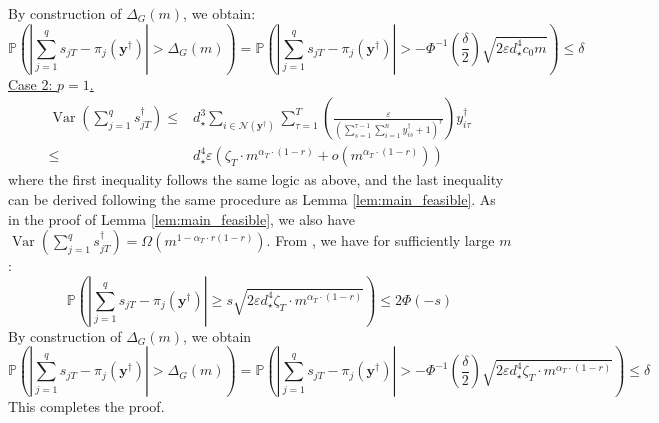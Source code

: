 \documentclass[nonblindrev]{informs3noheader}
\DeclareMathOperator{\Var}{Var}
\def\P{\mathbb{P}}
\def\calD{\mathcal{D}}
\def\calF{\mathcal{F}}
\def\calM{\mathcal{M}}
\def\calN{\mathcal{N}}
\def\by{\boldsymbol{y}}
\begin{document}
By construction of $\Delta_G(m)$, we obtain:
\[\P\left(\left|\sum_{j=1}^q s_{jT} - \pi_{j}(\by^\dagger)\right|>\Delta_G(m)\right)=\P\left(\left|\sum_{j=1}^q s_{jT} - \pi_{j}(\by^\dagger)\right|> -\Phi^{-1}\left(\frac{\delta}{2}\right)\sqrt{2\varepsilon d_\star^4 c_0 m}\right)\leq\delta \]
\underline{Case 2: $p=1$.}
\begin{align*}
	\Var\left(\sum_{j=1}^q s^\dagger_{jT}\right)
	\leq & d_\star^3\sum_{i \in \calN(\by^\dagger)} \sum_{\tau=1}^T \left(\frac{\varepsilon}{\left(\sum_{s=1}^{\tau-1} \sum_{i=1}^n y^\dagger_{is} + 1\right)^r}\right)y^\dagger_{i\tau}
	\\\leq & d_\star^4 \varepsilon\left(\zeta_T \cdot m^{\alpha_T \cdot (1-r)} + o\left(m^{\alpha_T \cdot (1-r)} \right)\right)
\end{align*}
where the first inequality follows the same logic as above, and the last inequality can be derived following the same procedure as Lemma \ref{lem:main_feasible}. As in the proof of Lemma \ref{lem:main_feasible}, we also have $\Var\left(\sum_{j=1}^q s^\dagger_{jT}\right)=\Omega(m^{1-\alpha_T\cdot r(1-r)})$. From \cite{janisch2024berry}, we have for sufficiently large $m$:
\[\P\left(\left|\sum_{j=1}^q s_{jT} - \pi_{j}(\by^\dagger)\right|\geq s\sqrt{2\varepsilon d_\star^4 \zeta_T \cdot m^{\alpha_T \cdot (1-r)} }\right)\leq2\Phi(-s) \]
By construction of $\Delta_G(m)$, we obtain
\[\P\left(\left|\sum_{j=1}^q s_{jT} - \pi_{j}(\by^\dagger)\right|> \Delta_G(m)\right)=\P\left(\left|\sum_{j=1}^q s_{jT} - \pi_{j}(\by^\dagger)\right|> -\Phi^{-1}\left(\frac{\delta}{2}\right)\sqrt{2\varepsilon d_\star^4 \zeta_T \cdot m^{\alpha_T \cdot (1-r)} }\right)\leq\delta \]
This completes the proof.
\hfill\Halmos
\end{document}
